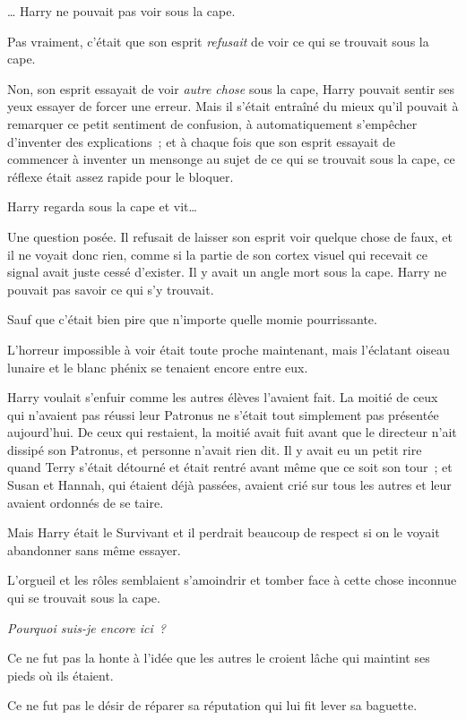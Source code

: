 … Harry ne pouvait pas voir sous la cape.

Pas vraiment, c'était que son esprit \emph{refusait} de voir ce qui se trouvait sous la cape.

Non, son esprit essayait de voir \emph{autre chose} sous la cape, Harry pouvait sentir ses yeux essayer de forcer une erreur. Mais il s'était entraîné du mieux qu'il pouvait à remarquer ce petit sentiment de confusion, à automatiquement s'empêcher d'inventer des explications~; et à chaque fois que son esprit essayait de commencer à inventer un mensonge au sujet de ce qui se trouvait sous la cape, ce réflexe était assez rapide pour le bloquer.

Harry regarda sous la cape et vit…

Une question posée. Il refusait de laisser son esprit voir quelque chose de faux, et il ne voyait donc rien, comme si la partie de son cortex visuel qui recevait ce signal avait juste cessé d'exister. Il y avait un angle mort sous la cape. Harry ne pouvait pas savoir ce qui s'y trouvait.

Sauf que c'était bien pire que n'importe quelle momie pourrissante.

L'horreur impossible à voir était toute proche maintenant, mais l'éclatant oiseau lunaire et le blanc phénix se tenaient encore entre eux.

Harry voulait s'enfuir comme les autres élèves l'avaient fait. La moitié de ceux qui n'avaient pas réussi leur Patronus ne s'était tout simplement pas présentée aujourd'hui. De ceux qui restaient, la moitié avait fuit avant que le directeur n'ait dissipé son Patronus, et personne n'avait rien dit. Il y avait eu un petit rire quand Terry s'était détourné et était rentré avant même que ce soit son tour~; et Susan et Hannah, qui étaient déjà passées, avaient crié sur tous les autres et leur avaient ordonnés de se taire.

Mais Harry était le Survivant et il perdrait beaucoup de respect si on le voyait abandonner sans même essayer.

L'orgueil et les rôles semblaient s'amoindrir et tomber face à cette chose inconnue qui se trouvait sous la cape.

\emph{Pourquoi suis-je encore ici~?}

Ce ne fut pas la honte à l'idée que les autres le croient lâche qui maintint ses pieds où ils étaient.

Ce ne fut pas le désir de réparer sa réputation qui lui fit lever sa baguette.

